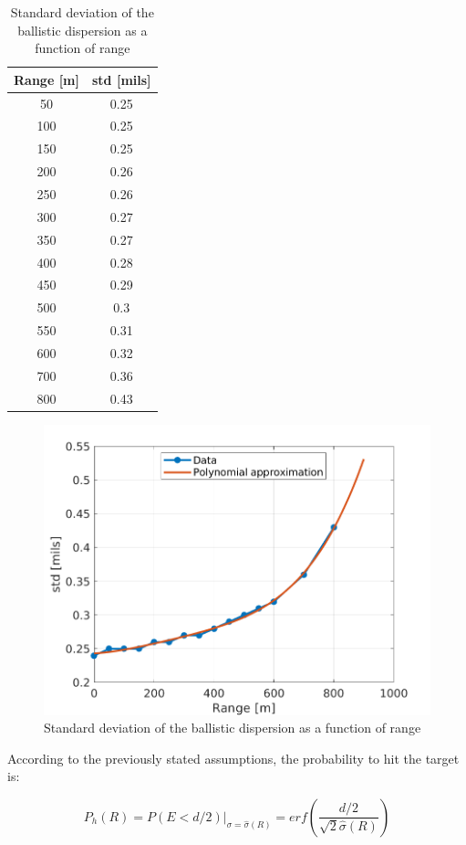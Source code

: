 \begin{table}[h!]
    \centering
    \begin{tabular}{|c|c|}
        \hline
        Range [m] & std [mils]\\\hline
        50 & 0.25\\\hline
        100 & 0.25\\\hline
        150 & 0.25\\\hline
        200 & 0.26\\\hline
        250 & 0.26\\\hline
        300 & 0.27\\\hline
        350 & 0.27\\\hline
        400 & 0.28\\\hline
        450 & 0.29\\\hline
        500 & 0.3\\\hline
        550 & 0.31\\\hline
        600 & 0.32\\\hline
        700 & 0.36\\\hline
        800 & 0.43\\\hline
    \end{tabular}
    \caption{Standard deviation of the ballistic dispersion as a function of range}
    \label{tab:std(range)}
\end{table}

\begin{figure}[h!]
    \centering
    \includegraphics[width=.7\textwidth]{images/std(range).png}
    \caption{Standard deviation of the ballistic dispersion as a function of range}
    \label{fig:std(range)}
\end{figure}

According to the previously stated assumptions, the probability to hit the target is:

\begin{equation} \label{eq:phit}
    P_h(R) = P(E<d/2)\Big\rvert_{\sigma=\hat{\sigma}(R)} = erf\left( \frac{d/2}{\sqrt{2}\hat{\sigma}(R)}\right)
\end{equation}

